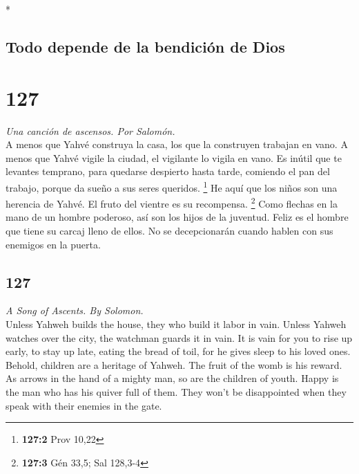 \begin{paracol}{2}
\begin{otherlanguage}{english}
\end{otherlanguage}

\switchcolumn[0]*

\hypertarget{todo-depende-de-la-bendiciuxf3n-de-dios}{%
\subsection{Todo depende de la bendición de
Dios}\label{todo-depende-de-la-bendiciuxf3n-de-dios}}

\hypertarget{section-252}{%
\section{127}\label{section-252}}

\emph{Una canción de ascensos. Por Salomón.}\\
 A menos que Yahvé construya la casa, los que la
construyen trabajan en vano. A menos que Yahvé vigile la ciudad, el
vigilante lo vigila en vano.  Es inútil que te levantes
temprano, para quedarse despierto hasta tarde, comiendo el pan del
trabajo, porque da sueño a sus seres queridos. \footnote{\textbf{127:2}
  Prov 10,22}  He aquí que los niños son una herencia de
Yahvé. El fruto del vientre es su recompensa. \footnote{\textbf{127:3}
  Gén 33,5; Sal 128,3-4}  Como flechas en la mano de un
hombre poderoso, así son los hijos de la juventud.  Feliz
es el hombre que tiene su carcaj lleno de ellos. No se decepcionarán
cuando hablen con sus enemigos en la puerta.

\switchcolumn
\begin{otherlanguage}{english}

\hypertarget{section-253}{%
\section{127}\label{section-253}}

\emph{A Song of Ascents. By Solomon.}\\
 Unless Yahweh builds the house, they who build it labor
in vain. Unless Yahweh watches over the city, the watchman guards it in
vain.  It is vain for you to rise up early, to stay up
late, eating the bread of toil, for he gives sleep to his loved ones.
 Behold, children are a heritage of Yahweh. The fruit of
the womb is his reward.  As arrows in the hand of a mighty
man, so are the children of youth.  Happy is the man who
has his quiver full of them. They won't be disappointed when they speak
with their enemies in the gate.


\end{otherlanguage}
\end{paracol}
